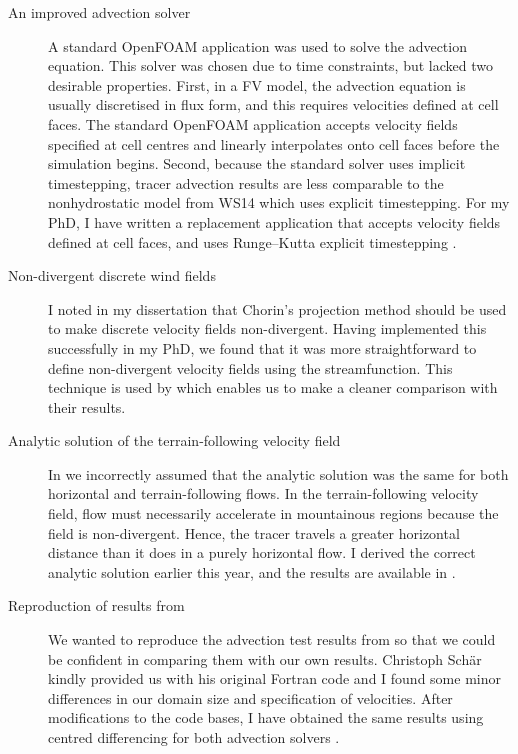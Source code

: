 \documentclass[a4paper]{article}
\begin{document}
\begin{description}
\item[An improved advection solver]{
A standard OpenFOAM application was used to solve the advection equation.  This solver was chosen due to time constraints, but lacked two desirable properties.
First, in a FV model, the advection equation is usually discretised in flux form, and this requires velocities defined at cell faces.  The standard OpenFOAM application accepts velocity fields specified at cell centres and linearly interpolates onto cell faces before the simulation begins.
Second, because the standard solver uses implicit timestepping, tracer advection results are less comparable to the nonhydrostatic model from WS14 which uses explicit timestepping.
For my PhD, I have written a replacement application that accepts velocity fields defined at cell faces, and uses Runge--Kutta explicit timestepping \citep[in preparation]{shaw-weller2015}.}

\item[Non-divergent discrete wind fields]{I noted in my dissertation that Chorin's projection method should be used to make discrete velocity fields non-divergent.  Having implemented this successfully in my PhD, we found that it was more straightforward to define non-divergent velocity fields using the streamfunction.  This technique is used by \citet{schaer2002} which enables us to make a cleaner comparison with their results.}

\item[Analytic solution of the terrain-following velocity field]{In \citet{shaw2014} we incorrectly assumed that the analytic solution was the same for both horizontal and terrain-following flows.  In the terrain-following velocity field, flow must necessarily accelerate in mountainous regions because the field is non-divergent.  Hence, the tracer travels a greater horizontal distance than it does in a purely horizontal flow.  I derived the correct analytic solution earlier this year, and the results are available in \citet{shaw-weller2015}.}

\item[Reproduction of results from \citet{schaer2002}]{We wanted to reproduce the advection test results from \citet{schaer2002} so that we could be confident in comparing them with our own results.  Christoph Sch\"{a}r kindly provided us with his original Fortran code and I found some minor differences in our domain size and specification of velocities.  After modifications to the code bases, I have obtained the same results using centred differencing for both advection solvers \citep{shaw-weller2015}.}
\end{description}
\end{document}
